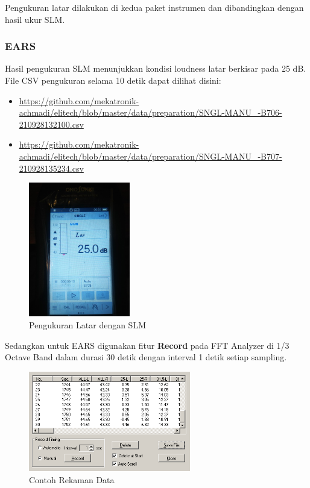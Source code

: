 \documentclass[12pt,]{article}
\begin{document}
	Pengukuran latar dilakukan di kedua paket instrumen dan dibandingkan dengan hasil ukur SLM.
	
	\subsubsection{EARS}
	
	Hasil pengukuran SLM menunjukkan kondisi loudness latar berkisar pada 25 dB.
	File CSV pengukuran selama 10 detik dapat dilihat disini:
	\begin{itemize}
		\item \url{https://github.com/mekatronik-achmadi/elitech/blob/master/data/preparation/SNGL-MANU_-B706-210928132100.csv}
		\item \url{https://github.com/mekatronik-achmadi/elitech/blob/master/data/preparation/SNGL-MANU_-B707-210928135234.csv}
	\end{itemize}
	
	\newpage
	\begin{figure}[!ht]
		\centering
		\includegraphics[width=125pt]{images/slm_latar}
		\caption{Pengukuran Latar dengan SLM}
	\end{figure}

	Sedangkan untuk EARS digunakan fitur \textbf{Record} pada FFT Analyzer di 1/3 Octave Band
	dalam durasi 30 detik dengan interval 1 detik setiap sampling.
	
	\begin{figure}[!ht]
		\centering
		\includegraphics[width=200pt]{images/datarec}
		\caption{Contoh Rekaman Data}
	\end{figure}
\end{document}
